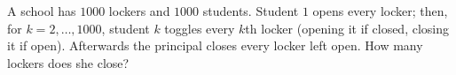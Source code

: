 A school has $1000$ lockers and $1000$ students. Student $1$ opens every locker; then, for $k=2,\dots,1000$, student $k$ toggles every $k$th locker (opening it if closed, closing it if open). Afterwards the principal closes every locker left open. How many lockers does she close?
